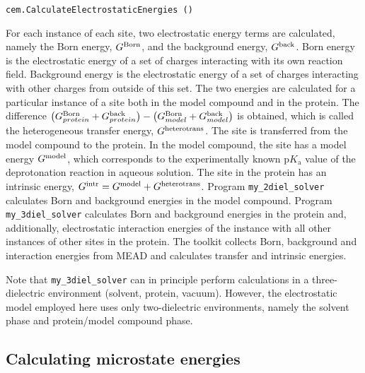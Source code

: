 \documentclass[12pt]{article}
\newcommand{\pka}{$\mathrm{p}K_{\mathrm{a}}$\xspace}
\begin{document}
{{\footnotesize \singlespacing \begin{lstlisting}
cem.CalculateElectrostaticEnergies ()
\end{lstlisting} }

For each instance of each site,
two electrostatic energy terms are calculated,
namely
the Born energy, $G^{\rm Born}$, and
the background energy, $G^{\rm back}$.
%
Born energy is the electrostatic energy of a set of charges interacting with its own
reaction field.
%
Background energy is the electrostatic energy of a set of charges interacting with
other charges from outside of this set.
%
The two energies are calculated for a particular instance of a site
both in the model compound and in the protein.
%
The difference
$\left( G^{\rm Born}_{protein} + G^{\rm back}_{protein} \right) - \left( G^{\rm Born}_{model} + G^{\rm back}_{model} \right)$
is obtained,
which is called the heterogeneous transfer energy, $G^{\rm heterotrans}$.
%
The site is transferred from the model compound to the protein.
%
In the model compound,
the site has a model energy $G^{\rm model}$,
which corresponds to the experimentally known \pka value of the deprotonation reaction in aqueous solution.
%
The site in the protein has an intrinsic energy,
$G^{\rm intr} = G^{\rm model} + G^{\rm heterotrans}$.
%
Program \texttt{my\_2diel\_solver} calculates Born and background energies in the model compound.
%
Program \texttt{my\_3diel\_solver} calculates Born and background energies in the protein and,
additionally,
electrostatic interaction energies of the instance
with all other instances of other sites in the protein.
%
The toolkit collects
Born,
background
and interaction energies from MEAD
and calculates transfer and intrinsic energies.


Note that \texttt{my\_3diel\_solver} can in principle perform calculations
in a three-dielectric environment (solvent, protein, vacuum).
%
However,
the electrostatic model employed here uses only two-dielectric environments,
namely the solvent phase and protein/model compound phase.


\subsection{Calculating microstate energies}

}
\end{document}
